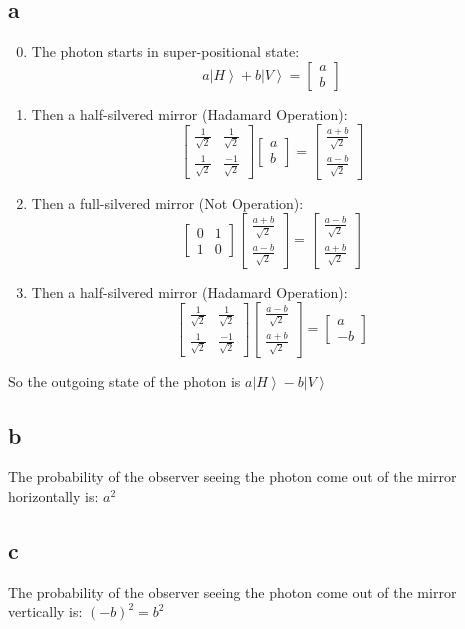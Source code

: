 \documentclass[letterpaper,notitlepage,twoside]{article}
\begin{document}
\subsection*{a}
\begin{enumerate}
\setcounter{enumi}{-1}
\item The photon starts in super-positional state:
\[
a\left|H\right>+b\left|V\right>=\begin{bmatrix}
    a \\
    b
\end{bmatrix}
\]
\item Then a half-silvered mirror (Hadamard Operation):
\[
\begin{bmatrix}
    \frac{1}{\sqrt{2}} & \frac{1}{\sqrt{2}} \\
    \frac{1}{\sqrt{2}} & \frac{-1}{\sqrt{2}}
\end{bmatrix}
\begin{bmatrix}
	a \\
	b
\end{bmatrix}
=
\begin{bmatrix}
	\frac{a+b}{\sqrt{2}} \\
	\frac{a-b}{\sqrt{2}}
\end{bmatrix}
\]
\item Then a full-silvered mirror (Not Operation):
\[
\begin{bmatrix}
    0 & 1 \\
    1 & 0
\end{bmatrix}
\begin{bmatrix}
	\frac{a+b}{\sqrt{2}} \\
	\frac{a-b}{\sqrt{2}}
\end{bmatrix}
=
\begin{bmatrix}
	\frac{a-b}{\sqrt{2}} \\
	\frac{a+b}{\sqrt{2}}
\end{bmatrix}
\]
\item Then a half-silvered mirror (Hadamard Operation):
\[
\begin{bmatrix}
    \frac{1}{\sqrt{2}} & \frac{1}{\sqrt{2}} \\
    \frac{1}{\sqrt{2}} & \frac{-1}{\sqrt{2}}
\end{bmatrix}
\begin{bmatrix}
	\frac{a-b}{\sqrt{2}} \\
	\frac{a+b}{\sqrt{2}}
\end{bmatrix}
=
\begin{bmatrix}
	a \\
	-b
\end{bmatrix}
\]
\end{enumerate}
So the outgoing state of the photon is $a\left|H\right>-b\left|V\right>$ 
\subsection*{b}
The probability of the observer seeing the photon come out of the mirror horizontally is: $a^2$
\subsection*{c}
The probability of the observer seeing the photon come out of the mirror vertically is: $(-b)^2 = b^2$
\end{document}
